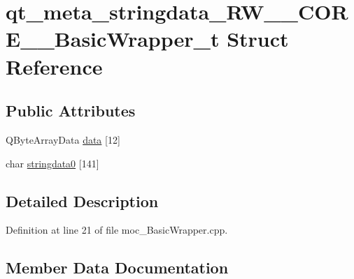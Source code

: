 \hypertarget{structqt__meta__stringdata___r_w_____c_o_r_e_____basic_wrapper__t}{}\section{qt\+\_\+meta\+\_\+stringdata\+\_\+\+R\+W\+\_\+\+\_\+\+C\+O\+R\+E\+\_\+\+\_\+\+Basic\+Wrapper\+\_\+t Struct Reference}
\label{structqt__meta__stringdata___r_w_____c_o_r_e_____basic_wrapper__t}
\subsection*{Public Attributes}
\begin{DoxyCompactItemize}
\item 
Q\+Byte\+Array\+Data \hyperlink{structqt__meta__stringdata___r_w_____c_o_r_e_____basic_wrapper__t_a41742c6e1cdccb82ba183c5e5f5d918a}{data} \mbox{[}12\mbox{]}
\item 
char \hyperlink{structqt__meta__stringdata___r_w_____c_o_r_e_____basic_wrapper__t_acfd3e55939192d866ddb55558956a9c6}{stringdata0} \mbox{[}141\mbox{]}
\end{DoxyCompactItemize}


\subsection{Detailed Description}


Definition at line 21 of file moc\+\_\+\+Basic\+Wrapper.\+cpp.



\subsection{Member Data Documentation}
\hypertarget{structqt__meta__stringdata___r_w_____c_o_r_e_____basic_wrapper__t_a41742c6e1cdccb82ba183c5e5f5d918a}{}\label{structqt__meta__stringdata___r_w_____c_o_r_e_____basic_wrapper__t_a41742c6e1cdccb82ba183c5e5f5d918a} 
